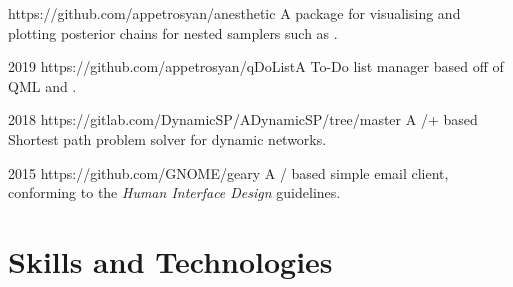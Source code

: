 \documentclass{CurriculumVitae}[10pt, condensed]
\begin{document}
{   {https://github.com/appetrosyan/anesthetic}
  {A package for visualising and plotting posterior chains for nested
    samplers such as .}

   {2019} {https://github.com/appetrosyan/qDoList}{A
    To-Do list manager based off of QML and .}

   {2018}
  {https://gitlab.com/DynamicSP/ADynamicSP/tree/master} {A
    /+ based Shortest path problem solver for
    dynamic networks. }

   {2015} {https://github.com/GNOME/geary} {A
    / based simple email client, conforming to the
     \emph{Human Interface Design} guidelines.}

}
\pagebreak{}
\section*{Skills and Technologies}
\end{document}

